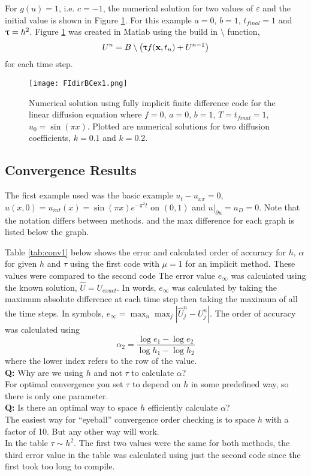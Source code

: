 For $g(u)=1$, i.e. $c=-1$, the numerical solution for two values of $\varepsilon$ and the initial value is shown in Figure \ref{fig:FIdirBCex1}. For this example $a=0$, $b=1$, $t_{final}=1$ and ${\uptau} = h^2$.  Figure \ref{fig:FIdirBCex1} was created in Matlab using the build in $\setminus$ function,
\begin{eqnarray} \label{eqn. ACSolveForUn}
 U^{n} = B \setminus \left( {\uptau} f(\mathbf{x},t_n)  +U^{n-1} \right)
\end{eqnarray}
for each time step.  %

		\begin{figure}[H]
		\centering
		\texttt{[image: FIdirBCex1.png]}
		\caption{Numerical solution using fully implicit finite difference code for the linear diffusion equation where $f=0$, $a=0$, $b=1$, $T=t_{final}=1$, $u_0 = \sin(\pi x) $. Plotted are numerical solutions for two diffusion coefficients, $k=0.1$ and $k=0.2$.}
		\label{fig:FIdirBCex1}
		\end{figure}


\subsection{Convergence Results}
The first example used was the basic example $u_t-u_{xx}=0$, $u(x,0)=u_{int}(x)= \sin(\pi x) e^{- \pi^2 t}$ on $(0,1)$ and $u|_{\partial u} = u_D=0$. Note that the notation differs between methods.  and the max difference for each graph is listed below the graph.

	Table \ref{tab:conv1} below shows the error and calculated order of accuracy for $h$, $\alpha$ for given $h$ and $\tau$ using the first code with $\mu = 1$ for an implicit method. These values were compared to the second code The error value $e_{\infty}$ was calculated using the known solution, $\hat{U}=U_{exact}$.  In words, $e_{\infty} $ was calculated by taking the maximum absolute difference at each time step then taking the maximum of all the time steps. In symbols, $e_{\infty} = \max_n \max_j  |\hat{U}_j^n-U_j^n|.$ The order of accuracy was calculated using 
	$$\alpha_2 = \frac{\log e_1-\log e_2}{\log h_1 - \log h_2}$$
	where the lower index refers to the row of the value.  \\
	\indent \textbf{Q:} Why are we using $h$ and not $\tau$ to calculate $\alpha$? 
    \\
    For optimal convergence you set $\tau$ to depend on $h$ in some predefined way, so there is only one parameter.\\
	\indent \textbf{Q:} Is there an optimal way to space $h$ efficiently calculate $\alpha$? 
    \\
    The easiest way for ``eyeball'' convergence order checking is to space $h$ with a factor of 10. But any other way will work.
    \\
	In the table $\tau \sim h^2$. The first two values were the same for both methods, the third error value in the table was calculated using just the second code since the first took too long to compile. 
 
